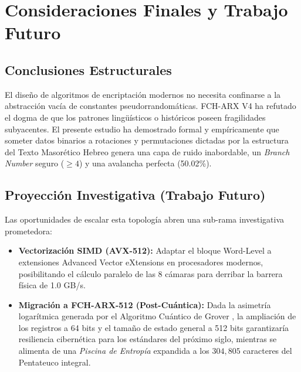 \documentclass[10pt,journal,compsoc]{IEEEtran}
\begin{document}
\section{Consideraciones Finales y Trabajo Futuro}

\subsection{Conclusiones Estructurales}
El diseño de algoritmos de encriptación modernos no necesita confinarse a la abstracción vacía de constantes pseudorrandomáticas. FCH-ARX V4 ha refutado el dogma de que los patrones lingüísticos o históricos poseen fragilidades subyacentes. El presente estudio ha demostrado formal y empíricamente que someter datos binarios a rotaciones y permutaciones dictadas por la estructura del Texto Masorético Hebreo genera una capa de ruido inabordable, un \textit{Branch Number} seguro ($\ge 4$) y una avalancha perfecta (50.02\%). 

\subsection{Proyección Investigativa (Trabajo Futuro)}
Las oportunidades de escalar esta topología abren una sub-rama investigativa prometedora:
\begin{itemize}
    \item \textbf{Vectorización SIMD (AVX-512):} Adaptar el bloque Word-Level a extensiones Advanced Vector eXtensions en procesadores modernos, posibilitando el cálculo paralelo de las 8 cámaras para derribar la barrera física de 1.0 GB/s.
    \item \textbf{Migración a FCH-ARX-512 (Post-Cuántica):} Dada la asimetría logarítmica generada por el Algoritmo Cuántico de Grover \cite{grover1996fast}, la ampliación de los registros a 64 bits y el tamaño de estado general a 512 bits garantizaría resiliencia cibernética para los estándares del próximo siglo, mientras se alimenta de una \textit{Piscina de Entropía} expandida a los $304,805$ caracteres del Pentateuco integral.
\end{itemize}
\end{document}
